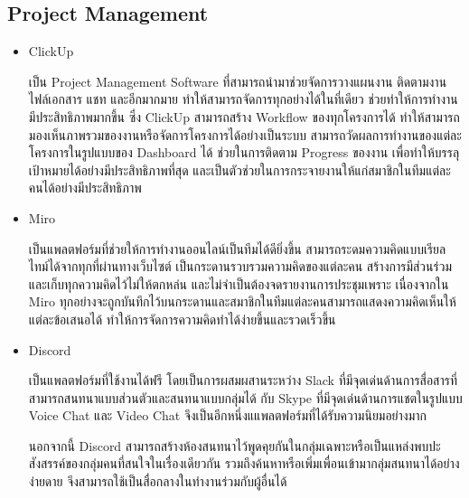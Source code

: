 \documentclass[12pt,oneside,openright,a4paper]{cpe-thai-project}
\begin{document}
  \subsection{Project Management}
    \begin{itemize}
      \item ClickUp
        
        \hspace{1cm}เป็น Project Management Software ที่สามารถนำมาช่วยจัดการวางแผนงาน ติดตามงาน ไฟล์เอกสาร แชท และอีกมากมาย 
        ทำให้สามารถจัดการทุกอย่างได้ในที่เดียว ช่วยทำให้การทำงานมีประสิทธิภาพมากขึ้น ซึ่ง ClickUp สามารถสร้าง Workflow ของทุกโครงการได้ 
        ทำให้สามารถมองเห็นภาพรวมของงานหรือจัดการโครงการได้อย่างเป็นระบบ 
        สามารถวัดผลการทำงานของแต่ละโครงการในรูปแบบของ Dashboard ได้ ช่วยในการติดตาม Progress ของงาน เพื่อทำให้บรรลุเป้าหมายได้อย่างมีประสิทธิภาพที่สุด 
        และเป็นตัวช่วยในการกระจายงานให้แก่สมาชิกในทีมแต่ละคนได้อย่างมีประสิทธิภาพ \cite{clickup}
      
      \item Miro
        
        \hspace{1cm}เป็นแพลตฟอร์มที่ช่วยให้การทำงานออนไลน์เป็นทีมได้ดียิ่งขึ้น สามารถระดมความคิดแบบเรียลไทม์ได้จากทุกที่ผ่านทางเว็บไซต์
        เป็นกระดานรวบรวมความคิดของแต่ละคน สร้างการมีส่วนร่วมและเก็บทุกความคิดไว้ไม่ให้ตกหล่น และไม่จำเป็นต้องจดรายงานการประชุมเพราะ 
        เนื่องจากใน Miro ทุกอย่างจะถูกบันทึกไว้บนกระดานและสมาชิกในทีมแต่ละคนสามารถแสดงความคิดเห็นให้แต่ละข้อเสนอได้ ทำให้การจัดการความคิดทำได้ง่ายขึ้นและรวดเร็วขึ้น \cite{miro}
      
      \item Discord
        
        \hspace{1cm}เป็นแพลตฟอร์มที่ใช้งานได้ฟรี โดยเป็นการผสมผสานระหว่าง Slack ที่มีจุดเด่นด้านการสื่อสารที่สามารถสนทนาแบบส่วนตัวและสนทนาแบบกลุ่มได้ 
        กับ Skype ที่มีจุดเด่นด้านการแชตในรูปแบบ Voice Chat และ Video Chat จึงเป็นอีกหนึ่งแแพลตฟอร์มที่ได้รับความนิยมอย่างมาก
        
        \hspace{1cm}นอกจากนี้ Discord สามารถสร้างห้องสนทนาไว้พูดคุยกันในกลุ่มเฉพาะหรือเป็นแหล่งพบปะสังสรรค์ของกลุ่มคนที่สนใจในเรื่องเดียวกัน 
        รวมถึงค้นหาหรือเพิ่มเพื่อนเข้ามากลุ่มสนทนาได้อย่างง่ายดาย จึงสามารถใช้เป็นสื่อกลางในทำงานร่วมกับผู้อื่นได้ \cite{discord}
    \end{itemize}
\end{document}
